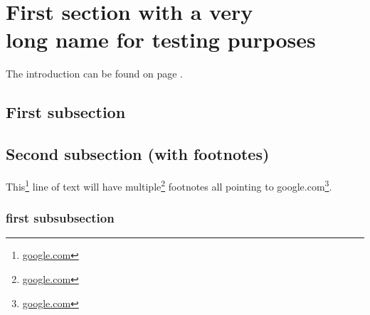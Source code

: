 \lipsum[1]

\section{First section with a very \\long name for testing purposes}
The introduction can be found on page \pageref{sec:introduction}.
\subsection{First subsection}
\lipsum[1-3]

\subsection{Second subsection (with footnotes)}
This\footnote{\url{google.com}} line of text will have multiple\footnote{\url{google.com}} footnotes all pointing to google.com\footnote{\url{google.com}}.

\subsubsection{first subsubsection}
\lipsum[1]